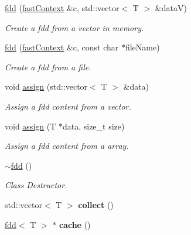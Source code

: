 \begin{DoxyCompactItemize}
\hyperlink{classfaster_1_1fdd_a76eee3a3adcb360d9b63bb50c1214de3}{fdd} (\hyperlink{classfaster_1_1fastContext}{fast\+Context} \&c, std\+::vector$<$ T $>$ \&dataV)
\begin{DoxyCompactList}\small\item\em Create a fdd from a vector in memory. \end{DoxyCompactList}\item 
\hypertarget{classfaster_1_1fdd_adc3ebc12c9d508b2957f5e6759544bee}{}\label{classfaster_1_1fdd_adc3ebc12c9d508b2957f5e6759544bee} 
\hyperlink{classfaster_1_1fdd_adc3ebc12c9d508b2957f5e6759544bee}{fdd} (\hyperlink{classfaster_1_1fastContext}{fast\+Context} \&c, const char $\ast$file\+Name)
\begin{DoxyCompactList}\small\item\em Create a fdd from a file. \end{DoxyCompactList}\item 
\hypertarget{classfaster_1_1fdd_ae1a17043db351aea043ab68a92976386}{}\label{classfaster_1_1fdd_ae1a17043db351aea043ab68a92976386} 
void \hyperlink{classfaster_1_1fdd_ae1a17043db351aea043ab68a92976386}{assign} (std\+::vector$<$ T $>$ \&data)
\begin{DoxyCompactList}\small\item\em Assign a fdd content from a vector. \end{DoxyCompactList}\item 
\hypertarget{classfaster_1_1fdd_a8ab9e1a569f83b5bc9cb70777a14297e}{}\label{classfaster_1_1fdd_a8ab9e1a569f83b5bc9cb70777a14297e} 
void \hyperlink{classfaster_1_1fdd_a8ab9e1a569f83b5bc9cb70777a14297e}{assign} (T $\ast$data, size\+\_\+t size)
\begin{DoxyCompactList}\small\item\em Assign a fdd content from a array. \end{DoxyCompactList}\item 
\hypertarget{classfaster_1_1fdd_aea20888cf4c003e7ad518e1a88e94200}{}\label{classfaster_1_1fdd_aea20888cf4c003e7ad518e1a88e94200} 
\hyperlink{classfaster_1_1fdd_aea20888cf4c003e7ad518e1a88e94200}{$\sim$fdd} ()
\begin{DoxyCompactList}\small\item\em Class Destructor. \end{DoxyCompactList}\item 
\hypertarget{classfaster_1_1fdd_a089aa4c91205948dacbc6e6bd6e5bcde}{}\label{classfaster_1_1fdd_a089aa4c91205948dacbc6e6bd6e5bcde} 
std\+::vector$<$ T $>$ {\bfseries collect} ()
\item 
\hypertarget{classfaster_1_1fdd_ac460ea12f02045a3d9203bb83eb5adb3}{}\label{classfaster_1_1fdd_ac460ea12f02045a3d9203bb83eb5adb3} 
\hyperlink{classfaster_1_1fdd}{fdd}$<$ T $>$ $\ast$ {\bfseries cache} ()
\end{DoxyCompactItemize}

